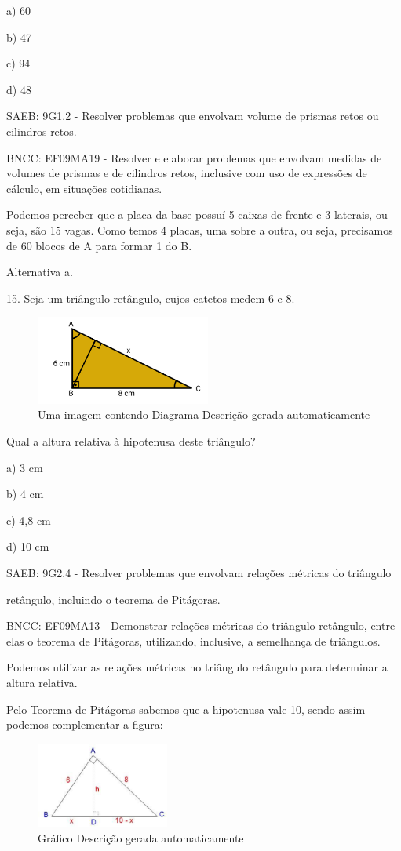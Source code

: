 \begin{escolha}
{{{\begin{escolha}
{{{{{\begin{escolha}
\begin{escolha}
{\begin{q°}
a) 60

b) 47

c) 94

d) 48

SAEB: 9G1.2 - Resolver problemas que envolvam volume de prismas retos ou
cilindros retos.

BNCC: EF09MA19 - Resolver e elaborar problemas que envolvam medidas de
volumes de prismas e de cilindros retos, inclusive com uso de expressões
de cálculo, em situações cotidianas.

Podemos perceber que a placa da base possuí 5 caixas de frente e 3
laterais, ou seja, são 15 vagas. Como temos 4 placas, uma sobre a outra,
ou seja, precisamos de 60 blocos de A para formar 1 do B.

Alternativa a.

15. Seja um triângulo retângulo, cujos catetos medem 6 e 8.

\begin{figure}
\centering
\includegraphics[width=2.26562in,height=1.15183in]{./_SAEB_9_MAT/media/image260.png}
\caption{Uma imagem contendo Diagrama Descrição gerada automaticamente}
\end{figure}

Qual a altura relativa à hipotenusa deste triângulo?

a) 3 cm

b) 4 cm

c) 4,8 cm

d) 10 cm

SAEB: 9G2.4 - Resolver problemas que envolvam relações métricas do
triângulo

retângulo, incluindo o teorema de Pitágoras.

BNCC: EF09MA13 - Demonstrar relações métricas do triângulo retângulo,
entre elas o teorema de Pitágoras, utilizando, inclusive, a semelhança
de triângulos.

Podemos utilizar as relações métricas no triângulo retângulo para
determinar a altura relativa.

Pelo Teorema de Pitágoras sabemos que a hipotenusa vale 10, sendo assim
podemos complementar a figura:

\begin{figure}
\centering
\includegraphics[width=1.71875in,height=1.10572in]{./_SAEB_9_MAT/media/image261.png}
\caption{Gráfico Descrição gerada automaticamente}
\end{figure}


\end{q°}}
\end{escolha}
\end{escolha}}}}}}
\end{escolha}}}}
\end{escolha}
